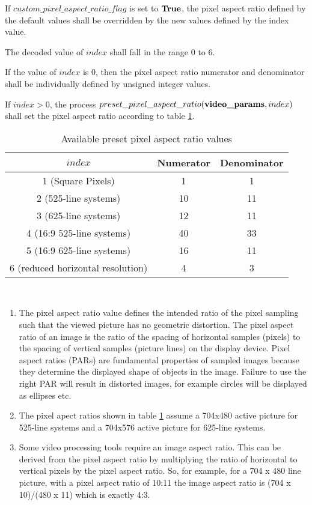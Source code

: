 If $custom\_pixel\_aspect\_ratio\_flag$ is set to $\text{\bf{True}}$, the pixel aspect ratio 
defined by the default values shall be overridden by the new values defined by the 
index value. 

The decoded value of $index$ shall fall in the range 0 to 6.

If the value of $index$ is 0, then the pixel aspect ratio numerator and denominator 
shall be individually defined by unsigned integer values.

If $index>0$, the process $preset\_pixel\_aspect\_ratio(\textbf{video\_params}, index)$ 
shall set the pixel aspect ratio according to table \ref{table:aspectratiovalues}.

\begin{table}[!ht]
\centering
\begin{tabular}{|c|c|c|}
\hline
\rowcolor[gray]{0.75}$index$ & Numerator & Denominator \\
\hline
1 (Square Pixels) & 1 & 1 \\
\hline
2 (525-line systems) & 10 & 11 \\
\hline
3 (625-line systems) & 12 & 11 \\
\hline
4 (16:9 525-line systems) & 40 & 33 \\
\hline
5 (16:9 625-line systems) & 16 & 11 \\
\hline
6 (reduced horizontal resolution) & 4 & 3 \\
\hline
\end{tabular}
\caption{Available preset pixel aspect ratio values}\label{table:aspectratiovalues}
\end{table}

\begin{informative}
 \\
\begin{enumerate}
\item The pixel aspect ratio value defines the intended ratio of the pixel 
sampling such that the viewed picture has no geometric distortion. The pixel aspect
 ratio of an image is the ratio of the spacing of horizontal samples 
(pixels) to the spacing of vertical samples (picture lines) on the display device. 
Pixel aspect ratios (PARs) are fundamental properties of sampled images because
 they determine the displayed shape of objects in the image. Failure to use the right
 PAR will result in distorted images, for example circles will be displayed as 
ellipses etc.   
\item The pixel apect ratios shown in table \ref{table:aspectratiovalues} assume
a 704x480 active picture for 525-line systems and a 704x576 active picture for 
625-line systems.
\item Some video processing tools require an image aspect ratio. This can be 
derived from the pixel aspect ratio by multiplying the ratio of horizontal to vertical 
pixels by the pixel aspect ratio. So, for example, for a 704 x 480 line picture, with 
a pixel aspect ratio of 10:11 the image aspect ratio is (704 x 10)/(480 x 11) which is
 exactly 4:3.
\end{enumerate}
\end{informative}

